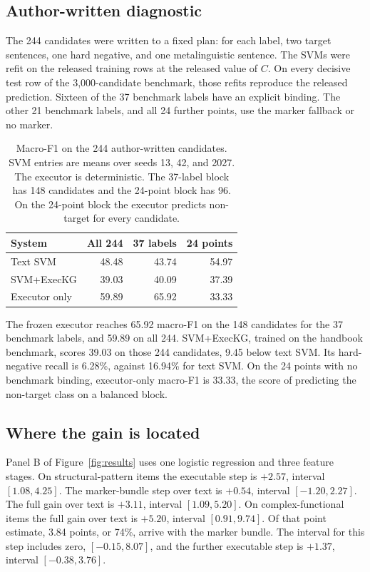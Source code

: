 \documentclass[pdflatex,sn-mathphys,NameDate]{sn-jnl}
\begin{document}
\subsection{Author-written diagnostic}
\label{sec:external}

The 244 candidates were written to a fixed plan: for each label, two target sentences, one hard negative, and one metalinguistic sentence.
The SVMs were refit on the released training rows at the released value of $C$.
On every decisive test row of the 3,000-candidate benchmark, those refits reproduce the released prediction.
Sixteen of the 37 benchmark labels have an explicit binding.
The other 21 benchmark labels, and all 24 further points, use the marker fallback or no marker.

\begin{table}[!ht]
\centering
\small
\begin{tabular}{lrrr}
\toprule
System & All 244 & 37 labels & 24 points \\
\midrule
Text SVM & 48.48 & 43.74 & 54.97 \\
SVM+ExecKG & 39.03 & 40.09 & 37.39 \\
Executor only & 59.89 & 65.92 & 33.33 \\
\bottomrule
\end{tabular}
\caption{Macro-F1 on the 244 author-written candidates. SVM entries are means over seeds 13, 42, and 2027. The executor is deterministic. The 37-label block has 148 candidates and the 24-point block has 96. On the 24-point block the executor predicts non-target for every candidate.}
\label{tab:external}
\end{table}

The frozen executor reaches 65.92 macro-F1 on the 148 candidates for the 37 benchmark labels, and 59.89 on all 244.
SVM+ExecKG, trained on the handbook benchmark, scores 39.03 on those 244 candidates, 9.45 below text SVM.
Its hard-negative recall is 6.28\%, against 16.94\% for text SVM.
On the 24 points with no benchmark binding, executor-only macro-F1 is 33.33, the score of predicting the non-target class on a balanced block.

\subsection{Where the gain is located}

Panel B of Figure~\ref{fig:results} uses one logistic regression and three feature stages.
On structural-pattern items the executable step is $+2.57$, interval $[1.08, 4.25]$.
The marker-bundle step over text is $+0.54$, interval $[-1.20, 2.27]$.
The full gain over text is $+3.11$, interval $[1.09, 5.20]$.
On complex-functional items the full gain over text is $+5.20$, interval $[0.91, 9.74]$.
Of that point estimate, 3.84 points, or 74\%, arrive with the marker bundle.
The interval for this step includes zero, $[-0.15, 8.07]$, and the further executable step is $+1.37$, interval $[-0.38, 3.76]$.
\end{document}
